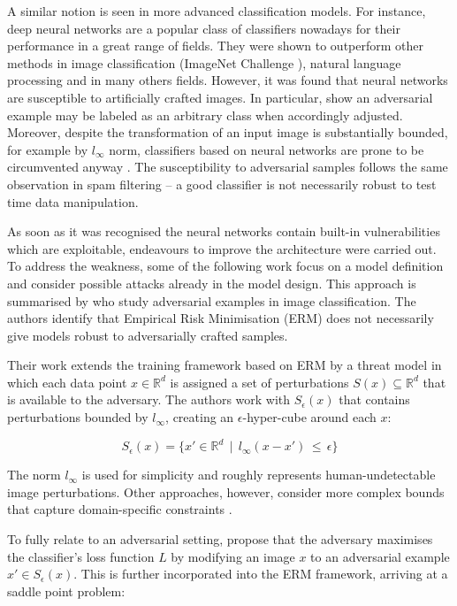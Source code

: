 A similar notion is seen in more advanced classification models. For
instance, deep neural networks are a popular class of classifiers
nowadays for their performance in a great range of fields. They were
shown to outperform other methods in image classification (ImageNet
Challenge \cite{image_net}), natural language processing \cite{transformer}
and in many others fields. However, it was found that neural networks
are susceptible to artificially crafted images. In particular,
\cite{adversarial_examples} show an adversarial example may be labeled as an
arbitrary class when accordingly adjusted. Moreover, despite the
transformation of an input image is substantially bounded, for example
by $l_\infty$ norm, classifiers based on neural networks are prone to
be circumvented anyway \cite{adversarial_examples_2}. The susceptibility to
adversarial samples follows the same observation in spam filtering – a
good classifier is not necessarily robust to test time data
manipulation.

As soon as it was recognised the neural networks contain built-in
vulnerabilities which are exploitable, endeavours to improve the
architecture were carried out. To address the weakness, some of the
following work focus on a model definition and consider possible attacks
already in the model design. This approach is summarised by
\cite{towards_deep_learning_models} who study adversarial examples
 in image classification.
The authors identify that Empirical Risk Minimisation (ERM) does not
necessarily give models robust to adversarially crafted samples.

Their work extends the training framework based on ERM by a threat model
in which each data point $x \in \mathbb{R}^d$ is assigned a set of
perturbations $S(x) \subseteq \mathbb{R}^d$ that is available to the
adversary. The authors work with $S_\epsilon(x)$ that contains
perturbations bounded by $l_\infty$, creating an
$\epsilon$-hyper-cube around each $x$:

\begin{equation}
S_\epsilon(x) = \{x' \in \mathbb{R}^d \, \mid \, l_\infty(x - x') \, \leq \, \epsilon \}
\end{equation}

The norm $l_\infty$ is used for simplicity and roughly represents
human-undetectable image perturbations. Other approaches, however,
consider more complex bounds that capture domain-specific constraints
\cite{adversarial_examples_glasses}.

To fully relate to an adversarial setting, \cite{towards_deep_learning_models} propose that
the adversary maximises the classifier's loss function $L$ by
modifying an image $x$ to an adversarial example
$x' \in S_\epsilon(x)$. This is further incorporated into the ERM
framework, arriving at a saddle point problem:

